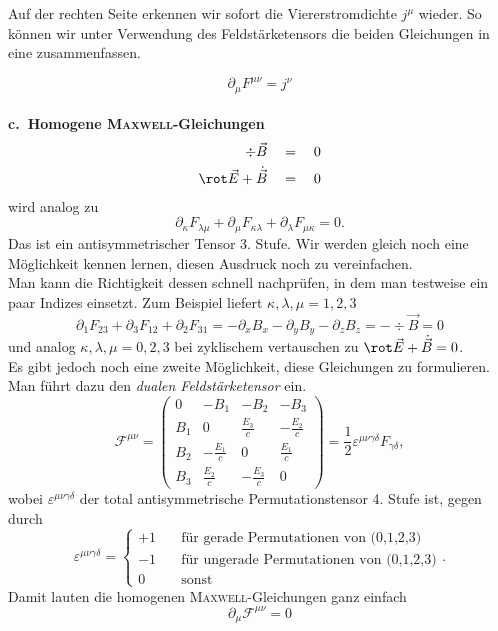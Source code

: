 Auf der rechten Seite erkennen wir sofort die Viererstromdichte $j^\mu$ wieder. So können wir unter Verwendung des Feldstärketensors die beiden Gleichungen in eine zusammenfassen.

\begin{equation*}
\partial_\mu F^{\mu\nu} =j^\nu
\end{equation*}
\ \\

\textbf{c.\ Homogene \textsc{Maxwell}-Gleichungen}
\begin{align*}
\div\vec{B}\quad &=\quad 0\\
\rot\vec{E}+\dot{\vec{B}}\quad &=\quad 0
\end{align*}
wird analog zu
\begin{equation*}
\partial_\kappa F_{\lambda\mu} + \partial_\mu F_{\kappa\lambda}+\partial_\lambda F_{\mu\kappa} = 0.
\end{equation*}
Das ist ein antisymmetrischer Tensor 3. Stufe. Wir werden gleich noch eine Möglichkeit kennen lernen, diesen Ausdruck noch zu vereinfachen. \\
Man kann die Richtigkeit dessen schnell nachprüfen, in dem man testweise ein paar Indizes einsetzt. Zum Beispiel liefert $\kappa,\lambda,\mu=1,2,3$
\begin{equation*}
\partial_1 F_{23}+\partial_3 F_{12} + \partial_2 F_{31} = -\partial_x B_x - \partial_y B_y - \partial_z B_z = -\div\vec{B}= 0
\end{equation*}
und analog $\kappa,\lambda,\mu = 0,2,3$ bei zyklischem vertauschen zu $\rot\vec{E}+\dot{\vec{B}} = 0$. \\

Es gibt jedoch noch eine zweite Möglichkeit, diese Gleichungen zu formulieren. Man führt dazu den \emph{dualen Feldstärketensor} ein.
\begin{equation*}
\mathcal{F}^{\mu\nu}=\begin{pmatrix}
0 & -B_1 & -B_2 & -B_3 \\
B_1 & 0 & \frac{E_3}{c} & -\frac{E_2}{c}\\
B_2 & -\frac{E_1}{c} & 0 & \frac{E_1}{c} \\
B_3 & \frac{E_2}{c} & -\frac{E_3}{c} & 0 
\end{pmatrix} = \frac{1}{2}\varepsilon^{\mu\nu\gamma\delta}F_{\gamma\delta},
\end{equation*}
wobei $\varepsilon^{\mu\nu\gamma\delta}$ der total antisymmetrische Permutationstensor 4. Stufe ist, gegen durch
\begin{equation*}
\varepsilon^{\mu\nu\gamma\delta} = \left\lbrace \begin{array}{rl}
+1 \quad & \text{für gerade Permutationen von (0,1,2,3)}\\
-1 \quad & \text{für ungerade Permutationen von (0,1,2,3)} \\
0 \quad & \text{sonst}
\end{array}\right. .
\end{equation*}
Damit lauten die homogenen \textsc{Maxwell}-Gleichungen ganz einfach
\begin{equation*}
\partial_\mu \mathcal{F}^{\mu\nu}=0
\end{equation*}
\ \\

